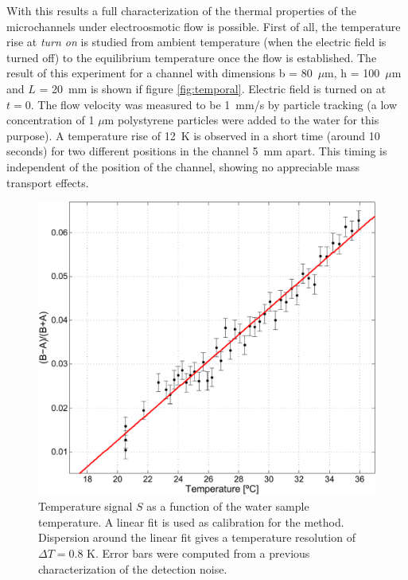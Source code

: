 \documentclass[9pt,twocolumn,twoside]{osajnl}
\begin{document}
With this results a full characterization of the thermal properties of the microchannels under electroosmotic flow is possible. First of all, the temperature rise at \textit{turn on} is studied from ambient temperature (when the electric field is turned off) to the equilibrium temperature once the flow is established. The result of this experiment for a channel with dimensions b = 80~$\mu\mathrm{m}$, h = 100~$\mu\mathrm{m}$ and $L$ = 20~mm is shown if figure \ref{fig:temporal}. Electric field is turned on at $t = 0$. The flow velocity was measured to be 1~mm/s by particle tracking (a low concentration of 1 $\mu$m polystyrene particles were added to the water for this purpose). A temperature rise of 12~K is observed in a short time (around 10 seconds) for two different positions in the channel 5~mm apart. This timing is independent of the position of the channel, showing no appreciable mass transport effects.

\begin{figure}[htbp]
\centering
\includegraphics[width=\columnwidth]{figs/fig3.pdf}
\caption{Temperature signal $S$ as a function of the water sample temperature. A linear fit is used as calibration for the method. Dispersion around the linear fit gives a temperature resolution of $\Delta T = 0.8$ K. Error bars were computed from a previous characterization of the detection noise. \label{fig:calib}}
\end{figure}
\end{document}
